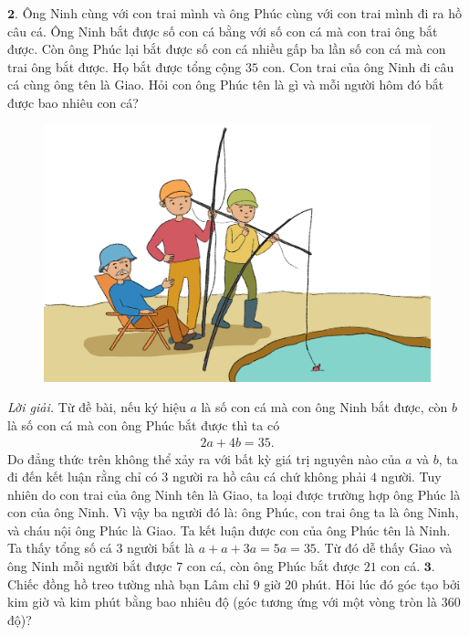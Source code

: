 \begin{multicols}{2}
\begin{figure}[H]
	\end{figure}
	$\pmb{2.}$ Ông Ninh cùng với con trai mình và ông Phúc cùng với con trai mình đi ra hồ câu cá. Ông Ninh bắt được số con cá bằng với số con cá mà con trai ông  bắt được. Còn ông Phúc lại bắt được số con cá nhiều gấp ba lần số con cá mà con trai ông bắt được. Họ bắt được tổng cộng  $35$ con. Con trai của ông Ninh đi câu cá cùng ông tên là Giao. Hỏi con ông Phúc tên là gì và mỗi người hôm đó bắt được bao nhiêu con cá?
	\begin{figure}[H]
	\centering
	\vspace*{-5pt}
	\captionsetup{labelformat= empty, justification=centering}
	\includegraphics[width=1\linewidth]{bai2}
	\vspace*{-15pt}
	\end{figure}
	\textit{Lời giải.} 	Từ đề bài, nếu ký hiệu $a$ là số con cá mà con ông Ninh bắt được, còn $b$ là số con cá mà con ông Phúc bắt được thì ta có 
	\begin{align*}
		2a+4b = 35.
	\end{align*}
	Do đẳng thức trên không thể xảy ra với bất kỳ giá trị nguyên nào của $a$ và $b$, ta đi đến kết luận rằng chỉ có $3$ người ra hồ câu cá chứ không phải $4$ người. Tuy nhiên do con trai của ông Ninh tên là Giao, ta loại được trường hợp ông Phúc là con của ông Ninh. Vì vậy ba người đó là: ông Phúc, con trai ông ta là ông Ninh,  và cháu nội ông Phúc là Giao. Ta kết luận được con của ông Phúc tên là Ninh.
	\vskip 0.1cm
	Ta thấy tổng số cá $3$ người bắt là $a+a+3a=5a = 35$. Từ đó dễ thấy Giao và ông Ninh mỗi người bắt được $7$ con cá, còn ông Phúc bắt được $21$ con cá.
	\vskip 0.1cm
	$\pmb{3.}$ Chiếc đồng hồ treo tường nhà bạn Lâm chỉ  $9$ giờ $20$ phút. Hỏi lúc đó góc tạo bởi kim giờ và kim phút bằng bao nhiêu độ (góc tương ứng với một vòng tròn là $360$ độ)?

\end{multicols}
